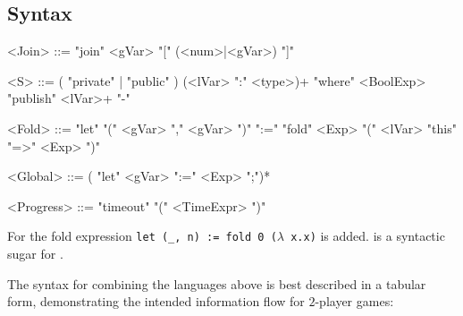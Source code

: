 \documentclass[acmsmall,review,anonymous]{acmart}\settopmatter{printfolios=true}
\begin{document}
\subsection{Syntax}

\begin{grammar}
	<Join>	::= "join" <gVar> "[" (<num>|<gVar>) "]" %

	<S>		::= ( "private" | "public" ) (<lVar> ":" <type>)+ "where" <BoolExp>  %
			\alt "publish" <lVar>+
			\alt "-"
\end{grammar}

\begin{grammar}
	<Fold> ::= "let" "(" <gVar> "," <gVar> ")" ":=" "fold" <Exp> "(" <lVar> "this" "=>" <Exp> ")"  %
\end{grammar}

\begin{grammar}
	<Global> ::= ( "let" <gVar> ":=" <Exp> ";")*
\end{grammar}

\begin{grammar}
	<Progress> ::= "timeout" "(" <TimeExpr> ")"
\end{grammar}

For  the fold expression \texttt{let (\_, n) := fold 0 ($\lambda$ x.x)} is added. 
 is a syntactic sugar for .

The syntax for combining the languages above is best described in a tabular form,
demonstrating the intended information flow for $2$-player games:
\end{document}
